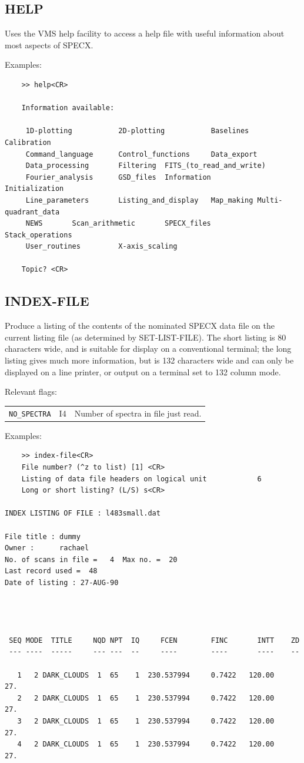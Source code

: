 \documentclass[11pt,twoside]{report}
\begin{document}
\subsection{HELP} 

Uses the VMS help facility to access a help file with useful information
about most aspects of SPECX.

Examples:
\begin{verbatim}
    >> help<CR>

    Information available:

     1D-plotting           2D-plotting           Baselines  Calibration
     Command_language      Control_functions     Data_export
     Data_processing       Filtering  FITS_(to_read_and_write)
     Fourier_analysis      GSD_files  Information           Initialization
     Line_parameters       Listing_and_display   Map_making Multi-quadrant_data
     NEWS       Scan_arithmetic       SPECX_files           Stack_operations
     User_routines         X-axis_scaling

    Topic? <CR>

\end{verbatim}

\subsection{INDEX-FILE} 

Produce a listing of the contents of the nominated SPECX data file on the
current listing file (as determined by SET-LIST-FILE). The short listing is 80
characters wide, and is suitable for display on a conventional terminal; the
long listing gives much more information, but is 132 characters wide and can
only be displayed on a line printer, or output on a terminal set to 132 column
mode.

Relevant flags:\\
\begin{tabular}{lll}
  \verb+NO_SPECTRA+ & I4 & Number of spectra in file just read.
\end{tabular}

Examples:
\begin{verbatim}
    >> index-file<CR>
    File number? (^z to list) [1] <CR>
    Listing of data file headers on logical unit            6
    Long or short listing? (L/S) s<CR>

INDEX LISTING OF FILE : l483small.dat

File title : dummy
Owner :      rachael
No. of scans in file =   4  Max no. =  20
Last record used =  48
Date of listing : 27-AUG-90




 SEQ MODE  TITLE     NQD NPT  IQ     FCEN        FINC       INTT    ZD
 --- ----  -----     --- ---  --     ----        ----       ----    --

   1   2 DARK_CLOUDS  1  65    1  230.537994     0.7422   120.00    27.
   2   2 DARK_CLOUDS  1  65    1  230.537994     0.7422   120.00    27.
   3   2 DARK_CLOUDS  1  65    1  230.537994     0.7422   120.00    27.
   4   2 DARK_CLOUDS  1  65    1  230.537994     0.7422   120.00    27.
\end{verbatim}
\end{document}
